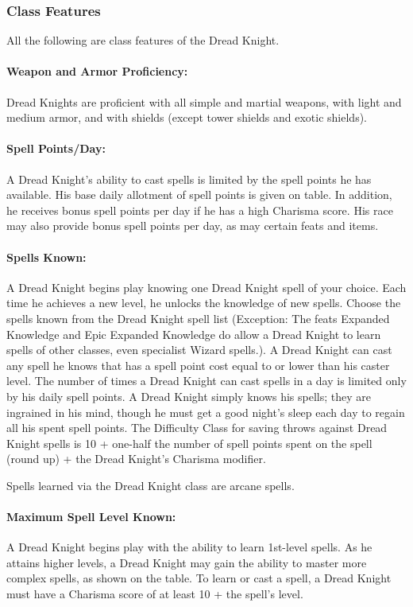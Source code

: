 \subsubsection{Class Features}
All the following are class features of the Dread Knight.

\paragraph{Weapon and Armor Proficiency:} 
Dread Knights are proficient with all simple and martial weapons, with light and medium armor, and with shields (except tower shields and exotic shields).

\paragraph{Spell Points/Day:} A Dread Knight's ability to cast spells is limited by the spell points he has available. 
His base daily allotment of spell points is given on  table. 
In addition, he receives bonus spell points per day if he has a high Charisma score.
His race may also provide bonus spell points per day, as may certain feats and items.

\paragraph{Spells Known:} A Dread Knight begins play knowing one Dread Knight spell of your choice. 
Each time he achieves a new level, he unlocks the knowledge of new spells.
Choose the spells known from the Dread Knight spell list (Exception: The feats Expanded Knowledge and Epic Expanded Knowledge do allow a Dread Knight to learn spells of other classes, even specialist Wizard spells.).
A Dread Knight can cast any spell he knows that has a spell point cost equal to or lower than his caster level.
The number of times a Dread Knight can cast spells in a day is limited only by his daily spell points. 
A Dread Knight simply knows his spells; they are ingrained in his mind, though he must get a good night's sleep each day to regain all his spent spell points.
The Difficulty Class for saving throws against Dread Knight spells is 10 + one-half the number of spell points spent on the spell (round up) + the Dread Knight's Charisma modifier. 

Spells learned via the Dread Knight class are arcane spells.

\paragraph{Maximum Spell Level Known:} A Dread Knight begins play with the ability to learn 1st-level spells. 
As he attains higher levels, a Dread Knight may gain the ability to master more complex spells, as shown on the  table.
To learn or cast a spell, a Dread Knight must have a Charisma score of at least 10 + the spell's level.

